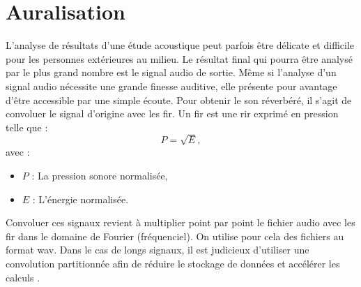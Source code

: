 


\section{Auralisation}
 \label{sect_TDS}

L'analyse de résultats d'une étude acoustique peut parfois être délicate et difficile pour les personnes extérieures au milieu. Le résultat final qui pourra être analysé par le plus grand nombre est le signal audio de sortie. Même si l'analyse d'un signal audio nécessite une grande finesse auditive, elle présente pour avantage d'être accessible par une simple écoute. Pour obtenir le son réverbéré, il s'agit de convoluer le signal d'origine avec les \gls{fir}. Un \gls{fir} est une \gls{rir} exprimé en pression telle que :
%
\begin{equation}
P = \sqrt{E},
\end{equation}
avec : 
\begin{itemize}
\item $P$ : La pression sonore normalisée,
\item $E$ : L'énergie normalisée.
\end{itemize}
%
Convoluer ces signaux revient à multiplier point par point le fichier audio avec les \gls{fir} dans le domaine de Fourier (fréquenciel).
On utilise pour cela des fichiers au format \gls{wav}. Dans le cas de longs signaux, il est judicieux d'utiliser une convolution partitionnée afin de réduire le stockage de données et accélérer les calculs \cite[2. Algorithm overview]{partition}. 

